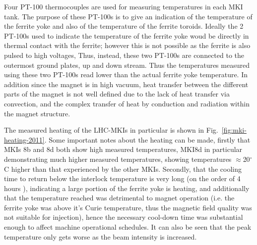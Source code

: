 Four PT-100 thermocouples are used for measuring temperatures in each MKI tank. The purpose of these PT-100s is to give an indication of the temperature of the ferrite yoke and also of the temperature of the ferrite toroids. Ideally the 2 PT-100s used to indicate the temperature of the ferrite yoke woud be directly in thermal contact with the ferrite; however this is not possible as the ferrite is also pulsed to high voltages, Thus, instead, these two PT-100s are connected to the outermost ground plates, up and down stream. Thus the temperatures measured using these two PT-100s read lower than the actual ferrite yoke temperature. In addition since the magnet is in high vacuum, heat transfer between the different parts of the magnet is not well defined due to the lack of heat transfer via convection, and the complex transfer of heat by conduction and radiation within the magnet structure.

The measured heating of the LHC-MKIs in particular is shown in Fig.~\ref{fig:mki-heating-2011}. Some important notes about the heating can be made, firstly that MKIs 8b and 8d both show high measured temperatures, MKI8d in particular demonstrating much higher measured temperatures, showing temperatures $\approx$20$^{\circ}$C higher than that experienced by the other MKIs. Secondly, that the cooling time to return below the interlock temperature is very long (on the order of 4 hours \cite{Goddard:timeConst}), indicating a large portion of the ferrite yoke is heating, and additionally that the temperature reached was detrimental to magnet operation (i.e. the ferrite yoke was above it's Curie temperature, thus the magnetic field quality was not suitable for injection), hence the necessary cool-down time was substantial enough to affect machine operational schedules. It can also be seen that the peak temperature only gets worse as the beam intensity is increased.

